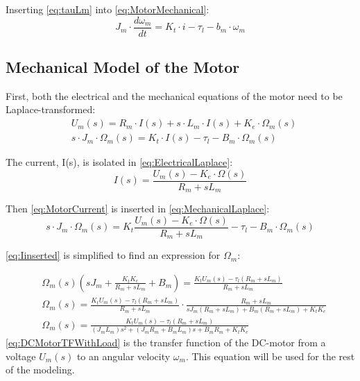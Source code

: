 Inserting \autoref{eq:tauLm} into \autoref{eq:MotorMechanical}:
\begin{equation}
	J_{m} \cdot \frac{d\omega_{m}}{dt} = K_{t} \cdot i - \tau_{l} - b_{m} \cdot \omega_{m}
\end{equation}

\subsection*{Mechanical Model of the Motor}
First, both the electrical and the mechanical equations of the motor need to be Laplace-transformed:
\begin{subequations}
	\begin{flalign}
		&U_{m}(s) = R_{m} \cdot I(s) + s \cdot L_{m} \cdot I(s) + K_{e} \cdot \Omega_{m}(s) \label{eq:ElectricalLaplace}\\	
		&s\cdot J_{m} \cdot \Omega_{m}(s) = K_{t} \cdot I(s) - \tau_{l} - B_{m} \cdot \Omega_{m}(s)	\label{eq:MechanicalLaplace}
	\end{flalign}
\end{subequations}

The current, I(s), is isolated in \autoref{eq:ElectricalLaplace}:
\begin{equation}
	I(s)=\frac{U_m(s)-K_e\cdot\Omega(s)}{R_m+sL_m}
	\label{eq:MotorCurrent}
\end{equation}

Then \autoref{eq:MotorCurrent} is inserted in \autoref{eq:MechanicalLaplace}:
\begin{equation}
	s\cdot J_{m} \cdot \Omega_{m}(s) = K_{t} \frac{U_m(s)-K_e\cdot\Omega(s)}{R_m+sL_m} - \tau_{l} - B_{m} \cdot \Omega_{m}(s)
	\label{eq:Iinserted}	
\end{equation}

\autoref{eq:Iinserted} is simplified to find an expression for $\Omega_m$: 

\begin{subequations}
	\begin{flalign}
		&\Omega_m(s) \left(sJ_m + \frac{K_tK_e}{R_m + sL_m} + B_m \right) = \frac{K_tU_m(s) - \tau_l(R_m + sL_m)}{R_m + sL_m} \\	
		&\Omega_m(s) = \frac{K_tU_m(s) - \tau_l(R_m + sL_m)}{R_m + sL_m} \cdot \frac{R_m + sL_m}{sJ_m(R_m + sL_m) + B_m(R_m + sL_m) + K_tK_e} \\
		&\Omega_m(s) = \frac{K_tU_m(s) - \tau_l(R_m + sL_m)}{(J_mL_m)s^2 + (J_mR_m + B_mL_m)s + B_mR_m + K_tK_e} \label{eq:DCMotorTFWithLoad}
	\end{flalign}
\end{subequations}
\autoref{eq:DCMotorTFWithLoad} is the transfer function of the DC-motor from a voltage $U_m(s)$ to an angular velocity $\omega_m$. This equation will be used for the rest of the modeling. 

